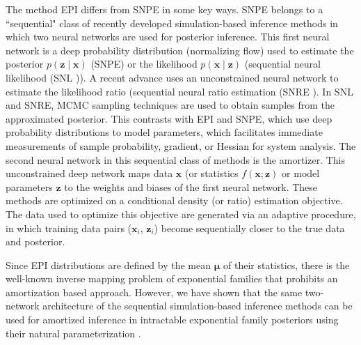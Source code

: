 \documentclass[11pt]{article}
\begin{document}
The method EPI differs from SNPE in some key ways.
SNPE belongs to a ``sequential" class of recently developed simulation-based inference methods in which two neural networks are used for posterior inference.
This first neural network is a deep probability distribution (normalizing flow) used to estimate the posterior $p(\mathbf{z} \mid \mathbf{x})$ (SNPE) or the likelihood  $p(\mathbf{x} \mid \mathbf{z})$ (sequential neural likelihood (SNL \cite{papamakarios2019sequential})).
A recent advance uses an unconstrained neural network to estimate the likelihood ratio (sequential neural ratio estimation (SNRE \cite{hermans2020likelihood}).
In SNL and SNRE, MCMC sampling techniques are used to obtain samples from the approximated posterior.
This contrasts with EPI and SNPE, which use deep probability distributions to model parameters, which facilitates immediate measurements of sample probability, gradient, or Hessian for system analysis.
The second neural network in this sequential class of methods is the amortizer.  This unconstrained deep network maps data $\mathbf{x}$ (or statistics $f(\mathbf{x}; \mathbf{z})$ or model parameters $\mathbf{z}$ to the weights and biases of the first neural network.
These methods are optimized on a conditional density (or ratio) estimation objective.
The data used to optimize this objective are generated via an adaptive procedure, in which training data pairs ($\mathbf{x}_i$, $\mathbf{z}_i$) become sequentially closer to the true data and posterior.

Since EPI distributions are defined by the mean $\bm{\mu}$ of their statistics, there is the well-known inverse mapping problem of exponential families \cite{wainwright2008graphical} that prohibits an amortization based approach.
However, we have shown that the same two-network architecture of the sequential simulation-based inference methods can be used for amortized inference in intractable exponential family posteriors using their natural parameterization \cite{bittner2019approximating}.
\end{document}

